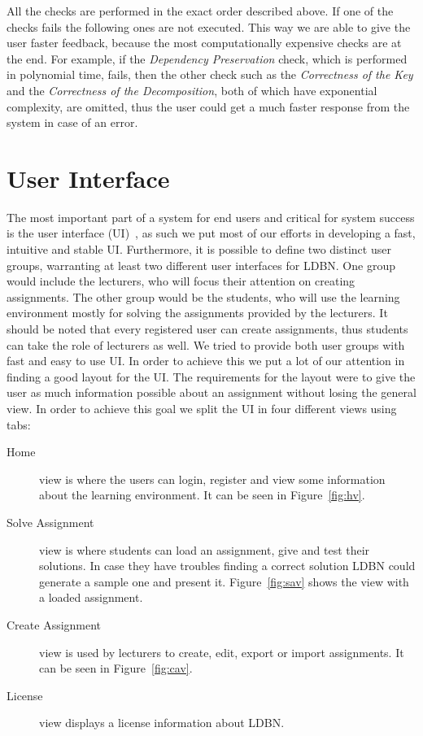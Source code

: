All the checks are performed in the exact order described above. If one of the checks fails the following ones
are not executed. This way we are able to give the user faster feedback, because 
the most computationally expensive checks are at the end. For example, if the \textit{Dependency Preservation}
check, which is performed in polynomial time, fails, then the other check such as the 
\textit{Correctness of the Key} and the \textit{Correctness of the Decomposition}, both of which 
have exponential complexity, are omitted, thus the user could get a much faster response from the system
in case of an error. 

\section{User Interface}
The most important part of a system for end users and critical for system 
success is the user interface (UI)~\cite{p9}, as such we put most of
our efforts in developing a fast, intuitive and stable UI. Furthermore,
it is possible to define two distinct user groups, warranting at least two different
user interfaces for LDBN.  One group would include the lecturers, who will
focus their attention on creating assignments. The other group would be the 
students, who will use the learning environment mostly for solving 
the assignments provided by the lecturers. It should be noted that every registered
user can create assignments, thus students can take the role of lecturers as well.
We tried to provide both 
user groups with fast and easy to use UI. In order to achieve this we put a lot
of our attention in finding a good layout for the UI. The requirements for
the layout were to give the user as much information possible about an 
assignment without losing the general view. In order to achieve this goal  
we split the UI in four different views using tabs:

\begin{description}
	\item[Home] view is where the users can login, register and view some information 
	about the learning environment. It can be seen in Figure~\ref{fig:hv}.
	\item[Solve Assignment] view is where students can load an assignment, give and
	test their solutions. In case they have troubles finding a correct solution
	LDBN could generate a sample one and present it. Figure~\ref{fig:sav} shows
	 the view with a loaded assignment.
	\item[Create Assignment] view is used by lecturers to create, edit, export or import
	assignments. It can be seen in Figure~\ref{fig:cav}.
	\item[License] view displays a license information about LDBN.
\end{description} 

